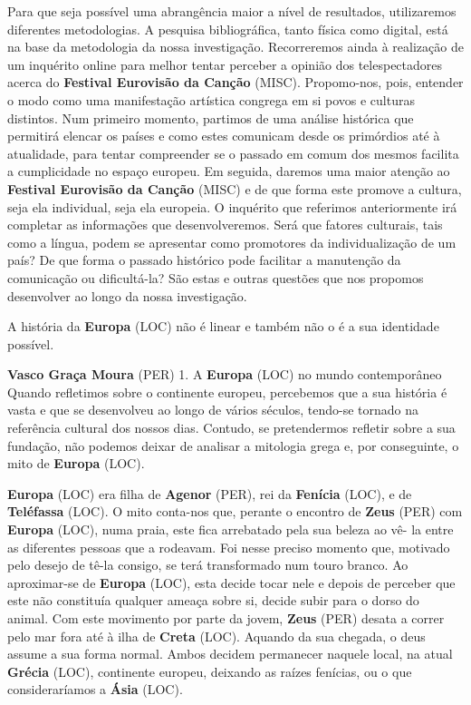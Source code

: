 \documentclass[12pt,a4paper]{article}
\begin{document}
Para que seja possível uma abrangência maior a nível de resultados, utilizaremos diferentes metodologias. A pesquisa bibliográfica, tanto física como digital, está na base da metodologia da nossa investigação. Recorreremos ainda à realização de um inquérito online para  melhor  tentar  perceber  a  opinião  dos  telespectadores  acerca  do  \textbf{Festival Eurovisão  da  Canção} (MISC).  Propomo-nos,  pois,  entender  o  modo  como  uma  manifestação artística congrega em si povos e culturas distintos. Num primeiro momento, partimos de uma análise histórica que permitirá elencar os países e como estes comunicam desde os primórdios até à atualidade, para tentar compreender se o passado em comum dos mesmos facilita a cumplicidade no espaço europeu. Em seguida, daremos uma maior atenção ao \textbf{Festival Eurovisão da Canção} (MISC) e de que forma este promove a cultura, seja ela individual, seja ela europeia. O inquérito que referimos anteriormente irá completar as informações que desenvolveremos. Será que fatores culturais, tais como a língua, podem se apresentar como promotores da individualização de um país? De que forma o passado histórico pode facilitar a manutenção da comunicação ou dificultá-la? São estas e outras questões que nos propomos desenvolver ao longo da nossa investigação.

A história da \textbf{Europa} (LOC) não é linear e também não o é a sua identidade possível.

\textbf{Vasco Graça Moura} (PER) 1. A \textbf{Europa} (LOC) no mundo contemporâneo Quando refletimos sobre o continente europeu, percebemos que a sua história é vasta e que  se desenvolveu ao longo  de vários séculos, tendo-se tornado  na referência cultural  dos  nossos  dias.  Contudo,  se  pretendermos  refletir  sobre  a  sua  fundação,  não podemos  deixar  de  analisar  a  mitologia  grega  e,  por  conseguinte,  o  mito  de  \textbf{Europa} (LOC).

\textbf{Europa} (LOC) era filha de \textbf{Agenor} (PER), rei da \textbf{Fenícia} (LOC), e de \textbf{Teléfassa} (LOC). O mito conta-nos que, perante o encontro de \textbf{Zeus} (PER) com \textbf{Europa} (LOC), numa praia, este fica arrebatado pela sua beleza ao vê- la entre as diferentes pessoas que a rodeavam. Foi nesse preciso momento que, motivado pelo desejo de tê-la consigo, se terá transformado num touro branco. Ao aproximar-se de \textbf{Europa} (LOC),  esta  decide  tocar  nele  e  depois  de  perceber  que  este  não  constituía  qualquer ameaça sobre si, decide subir para o dorso do animal. Com este movimento por parte da jovem, \textbf{Zeus} (PER) desata a correr pelo mar fora até à ilha de \textbf{Creta} (LOC). Aquando da sua chegada, o deus  assume  a  sua  forma  normal.  Ambos  decidem  permanecer  naquele  local,  na  atual \textbf{Grécia} (LOC), continente europeu, deixando as raízes fenícias, ou o que consideraríamos a \textbf{Ásia} (LOC).
\end{document}
